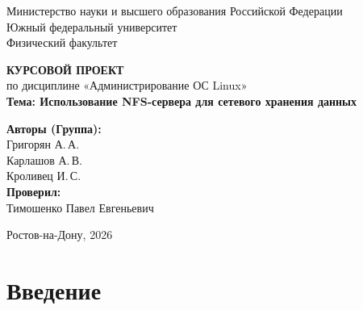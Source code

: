 \documentclass[14pt,a4paper]{extarticle}
\begin{document}
	
	\thispagestyle{empty}
	\begin{center}
		{\normalsize
			Министерство науки и высшего образования Российской Федерации\\[4pt]
			Южный федеральный университет\\[4pt]
			Физический факультет\\[40pt]
		}
		
		{\Large\bfseries КУРСОВОЙ ПРОЕКТ}\\[10pt]
		{\normalsize по дисциплине «Администрирование ОС Linux»}\\[30pt]
		
		{\large\bfseries Тема: Использование NFS-сервера для сетевого хранения данных}\\[50pt]
		
		\begin{flushleft}
			\hspace{6cm}
			\begin{minipage}{0.5\textwidth}
				\textbf{Авторы (Группа):}\\[4pt]
				Григорян А.\,А.\\
				Карлашов А.\,В.\\
				Кроливец И.\,С.\\[20pt]
				\textbf{Проверил:}\\[4pt]
				Тимошенко Павел Евгеньевич
			\end{minipage}
		\end{flushleft}
		
		\vfill
		{\normalsize Ростов-на-Дону, 2026}
	\end{center}
	
	\newpage
	
	\thispagestyle{fancy}
	\tableofcontents
	
	\newpage
	
	\section*{Введение}
	
\end{document}
